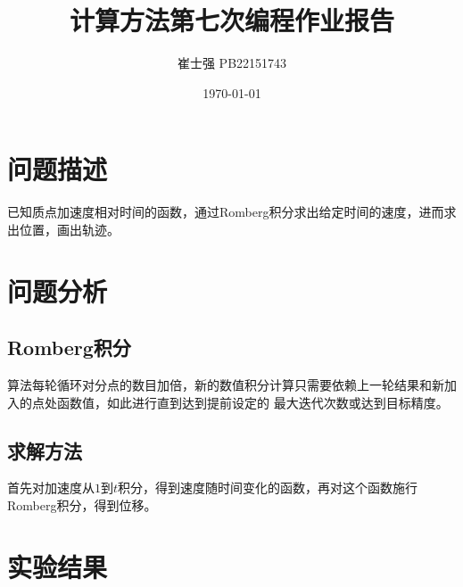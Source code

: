 \documentclass[UTF8]{ctexart}
\title{计算方法第七次编程作业报告}
\author{崔士强 PB22151743}
\date{\today}
\begin{document}
\maketitle

\section{问题描述}
已知质点加速度相对时间的函数，通过Romberg积分求出给定时间的速度，进而求出位置，画出轨迹。
\section{问题分析}
\subsection{Romberg积分}
算法每轮循环对分点的数目加倍，新的数值积分计算只需要依赖上一轮结果和新加入的点处函数值，如此进行直到达到提前设定的
最大迭代次数或达到目标精度。

\subsection{求解方法}
首先对加速度从$1$到$t$积分，得到速度随时间变化的函数，再对这个函数施行Romberg积分，得到位移。

\section{实验结果}
\end{document}
